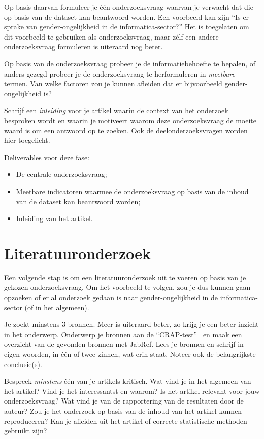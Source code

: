 \documentclass[fleqn,10pt]{voorstel}
\begin{document}
Op basis daarvan formuleer je één onderzoeksvraag waarvan je verwacht dat die op basis van de dataset kan beantwoord worden. Een voorbeeld kan zijn ``Is er sprake van gender-ongelijkheid in de informatica-sector?''
Het is toegelaten om dit voorbeeld te gebruiken als onderzoeksvraag,
maar zélf een andere onderzoeksvraag formuleren is uiteraard nog beter.

Op basis van de onderzoeksvraag probeer je de informatiebehoefte te bepalen, of anders gezegd probeer je de onderzoeksvraag te herformuleren in \emph{meetbare} termen. Van welke factoren zou je kunnen afleiden dat er bijvoorbeeld gender-ongelijkheid is?

Schrijf een \emph{inleiding} voor je artikel waarin de context van het onderzoek besproken wordt en waarin je motiveert waarom deze onderzoeksvraag de moeite waard is om een antwoord op te zoeken. Ook de deelonderzoeksvragen worden hier toegelicht.

Deliverables voor deze fase:

\begin{itemize}
  \item De centrale onderzoeksvraag;
  \item Meetbare indicatoren waarmee de onderzoeksvraag op basis van de inhoud van de dataset kan beantwoord worden;
  \item Inleiding van het artikel.
\end{itemize}

\section{Literatuuronderzoek}

Een volgende stap is om een literatuuronderzoek uit te voeren op basis van je gekozen onderzoeksvraag. Om het voorbeeld te volgen, zou je dus kunnen gaan opzoeken of er al onderzoek gedaan is naar gender-ongelijkheid in de informatica-sector (of in het algemeen).

Je zoekt minstens 3 bronnen.
Meer is uiteraard beter, zo krijg je een beter inzicht in het onderwerp.
Onderwerp je bronnen aan de ``CRAP-test''~\autocite{Gratz2015}
en maak een overzicht van de gevonden bronnen met JabRef.
Lees je bronnen en schrijf in eigen woorden, in één of twee zinnen, wat erin staat. Noteer ook de belangrijkste conclusie(s).

Bespreek \emph{minstens} één van je artikels kritisch. Wat vind je in het algemeen van het artikel? Vind je het interessantst en waarom? Is het artikel relevant voor jouw onderzoeksvraag? Wat vind je van de rapportering van de resultaten door de auteur? Zou je het onderzoek op basis van de inhoud van het artikel kunnen reproduceren? Kan je afleiden uit het artikel of correcte statistische methoden gebruikt zijn?
\end{document}
